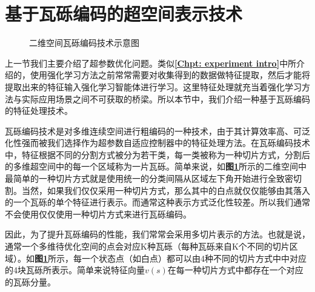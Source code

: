 \section{基于瓦砾编码的超空间表示技术}
\label{sec: tile coding}

\begin{figure}[!t]
	\centering
	\caption{二维空间瓦砾编码技术示意图}
	\label{Fig: tile coding}
\end{figure}


上一节我们主要介绍了超参数优化问题。类似\textbf{\ref{Chpt: experiment intro}}中所介绍的，使用强化学习方法之前常常需要对收集得到的数据做特征提取，然后才能将提取出来的特征输入强化学习智能体进行学习。这里特征处理就充当着强化学习方法与实际应用场景之间不可获取的桥梁。所以本节中，我们介绍一种基于瓦砾编码的特征处理技术。

瓦砾编码技术是对多维连续空间进行粗编码的一种技术，由于其计算效率高、可泛化性强而被我们选择作为超参数自适应控制器中的特征处理方法。在瓦砾编码技术中，特征根据不同的分割方式被分为若干类，每一类被称为一种切片方式，分割后的多维超空间中的每一个区域称为一片瓦砾。简单来说，如\textbf{图\ref{Fig: tile coding}}所示的二维空间中最简单的一种切片方式就是使用统一的分类间隔从区域左下角开始进行全致密切割。当然，如果我们仅仅采用一种切片方式，那么其中的白点就仅仅能够由其落入的一个瓦砾的单个特征进行表示。而通常这种表示方式泛化性较差。所以我们通常不会使用仅仅使用一种切片方式来进行瓦砾编码。

因此，为了提升瓦砾编码的性能，我们常常会采用多切片表示的方法。也就是说，通常一个多维待优化空间的点会对应K种瓦砾（每种瓦砾来自K个不同的切片区域）。如\textbf{图\ref{Fig: tile coding}}所示，每一个状态点（如白点）都可以由4种不同的切片方式中中对应的4块瓦砾所表示。简单来说特征向量$v(s)$在每一种切片方式中都存在一个对应的瓦砾分量。

